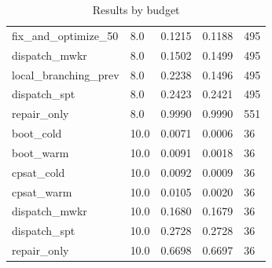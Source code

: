 \begin{table}[t]
\begin{tabular}{lllll}
fix\_and\_optimize\_50 & 8.0 & 0.1215 & 0.1188 & 495 \\
dispatch\_mwkr & 8.0 & 0.1502 & 0.1499 & 495 \\
local\_branching\_prev & 8.0 & 0.2238 & 0.1496 & 495 \\
dispatch\_spt & 8.0 & 0.2423 & 0.2421 & 495 \\
repair\_only & 8.0 & 0.9990 & 0.9990 & 551 \\
boot\_cold & 10.0 & 0.0071 & 0.0006 & 36 \\
boot\_warm & 10.0 & 0.0091 & 0.0018 & 36 \\
cpsat\_cold & 10.0 & 0.0092 & 0.0009 & 36 \\
cpsat\_warm & 10.0 & 0.0105 & 0.0020 & 36 \\
dispatch\_mwkr & 10.0 & 0.1680 & 0.1679 & 36 \\
dispatch\_spt & 10.0 & 0.2728 & 0.2728 & 36 \\
repair\_only & 10.0 & 0.6698 & 0.6697 & 36 \\
\bottomrule
\end{tabular}
\caption{Results by budget}
\label{tab:by-budget}
\end{table}
